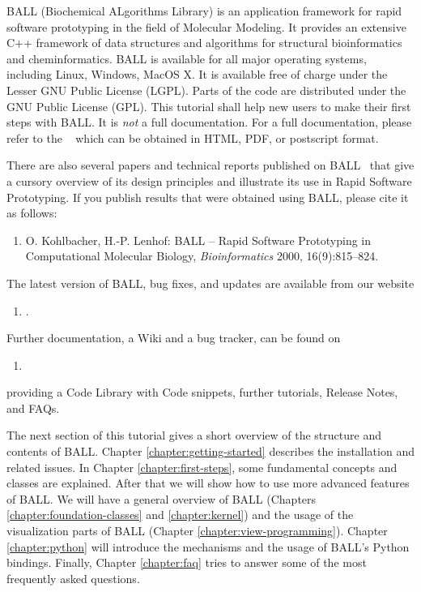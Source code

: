 \noindent
BALL (Biochemical ALgorithms Library) is an application framework for rapid
software prototyping in the field of Molecular Modeling.
It provides an extensive C++ framework of data structures and algorithms for
structural bioinformatics and cheminformatics.
BALL is available for all major operating systems, including Linux, Windows, MacOS X.
It is available free of charge under the Lesser GNU Public License (LGPL).
Parts of the code are distributed under the GNU Public License (GPL).
This tutorial shall help new users to make their first steps with BALL.
It is {\em not} a full documentation. For a full documentation, please refer to the ~\cite{BALL-RM} which can be obtained in HTML, PDF, or postscript format.

There are also several papers and technical reports published on
BALL~\cite{BKL99a,BKL99b,KL99,Koh2001,KL2000,MHLK05,MHLK06}
that give a cursory overview of its design principles and illustrate its use in
Rapid Software Prototyping. If you publish results that were obtained using 
BALL, please cite it as follows:
\begin{enumerate}
  \item[] O. Kohlbacher, H.-P. Lenhof: BALL -- Rapid Software Prototyping
          in Computational Molecular Biology, {\em Bioinformatics} 2000,
          16(9):815--824.
\end{enumerate}

\noindent
The latest version of BALL, bug fixes, and updates are available from our 
website

\begin{enumerate}
  \item[] .
\end{enumerate}

\noindent
Further documentation, a Wiki and a bug tracker, can be found on 

\begin{enumerate}
  \item[] 
\end{enumerate}
providing a Code Library with Code snippets, further tutorials, Release Notes, and FAQs.


The next section of this tutorial gives a short overview of the structure and
contents of BALL. Chapter \ref{chapter:getting-started} describes the
installation and related issues. In Chapter \ref{chapter:first-steps}, some
fundamental concepts and classes are explained. After that we will show how to
use more advanced features of BALL. We will have a general overview of BALL 
 (Chapters \ref{chapter:foundation-classes} and  \ref{chapter:kernel}) 
and the usage of the visualization parts of BALL (Chapter \ref{chapter:view-programming}). 
Chapter \ref{chapter:python} will introduce the mechanisms and the usage of
BALL's Python bindings.  Finally, Chapter
\ref{chapter:faq} tries to answer some of the most frequently asked questions.

